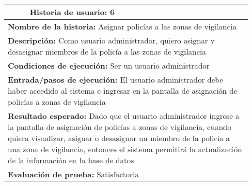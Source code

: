 \begin{longtable}{|p{6.7cm}|p{6.7cm}|}
    \hline
    \endlastfoot
    \multicolumn{1}{|p{6.7cm}|}{\textbf{Número} 6 } & \multicolumn{1}{|p{6.7cm}|}{\textbf{Historia de usuario:} 6}                                                                                                                                                                                                                                             \\
    \hline
    \multicolumn{2}{|p{13.4cm}|}{\textbf{Nombre de la historia:} Asignar policías a las zonas de vigilancia }                                                                                                                                                                                                                                                  \\
    \hline
    \multicolumn{2}{|p{13.4cm}|}{\textbf{Descripción:} Como usuario administrador, quiero asignar y desasignar miembros de la policía a las zonas de vigilancia}                                                                                                                                                                                               \\
    \hline
    \multicolumn{2}{|p{13.4cm}|}{\textbf{Condiciones de ejecución:} Ser un usuario administrador}                                                                                                                                                                                                                                                              \\
    \hline
    \multicolumn{2}{|p{13.4cm}|}{\textbf{Entrada/pasos de ejecución:} El usuario administrador debe haber accedido al sistema e ingresar en la pantalla de asignación de policías a zonas de vigilancia}                                                                                                                                                       \\
    \hline
    \multicolumn{2}{|p{13.4cm}|}{\textbf{Resultado esperado:} Dado que el usuario administrador ingrese a la pantalla de asignación de policías a zonas de vigilancia, cuando quiera visualizar, asignar o desasignar un miembro de la policía a una zona de vigilancia, entonces el sistema permitirá la actualización de la información en la base de datos} \\
    \hline
    \multicolumn{2}{|p{13.4cm}|}{\textbf{Evaluación de prueba:} Satisfactoria}                                                                                                                                                                                                                                                                                 \\
    \hline
\end{longtable}

